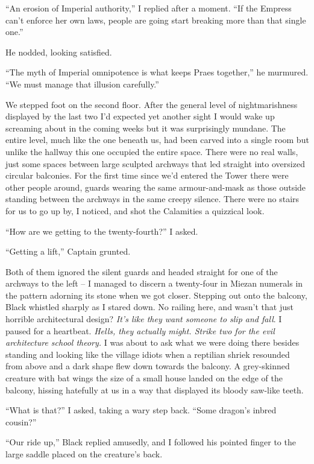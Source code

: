 \documentclass[12pt, openany]{book}
\begin{document}
“An erosion of Imperial authority,” I replied after a moment. “If the Empress can’t enforce her own laws, people are going start breaking more than that single one.”

He nodded, looking satisfied.

“The myth of Imperial omnipotence is what keeps Praes together,” he murmured. “We must manage that illusion carefully.”

We stepped foot on the second floor. After the general level of nightmarishness displayed by the last two I’d expected yet another sight I would wake up screaming about in the coming weeks but it was surprisingly mundane. The entire level, much like the one beneath us, had been carved into a single room but unlike the hallway this one occupied the entire space. There were no real walls, just some spaces between large sculpted archways that led straight into oversized circular balconies. For the first time since we’d entered the Tower there were other people around, guards wearing the same armour-and-mask as those outside standing between the archways in the same creepy silence. There were no stairs for us to go up by, I noticed, and shot the Calamities a quizzical look.

“How are we getting to the twenty-fourth?” I asked.

“Getting a lift,” Captain grunted.

Both of them ignored the silent guards and headed straight for one of the archways to the left – I managed to discern a twenty-four in Miezan numerals in the pattern adorning its stone when we got closer. Stepping out onto the balcony, Black whistled sharply as I stared down. No railing here, and wasn’t that just horrible architectural design? \textit{It’s like they want someone to slip and fall}. I paused for a heartbeat.\textit{ Hells, they actually might. Strike two for the evil architecture school theory.} I was about to ask what we were doing there besides standing and looking like the village idiots when a reptilian shriek resounded from above and a dark shape flew down towards the balcony. A grey-skinned creature with bat wings the size of a small house landed on the edge of the balcony, hissing hatefully at us in a way that displayed its bloody saw-like teeth.

“What is that?” I asked, taking a wary step back. “Some dragon’s inbred cousin?”

“Our ride up,” Black replied amusedly, and I followed his pointed finger to the large saddle placed on the creature’s back.
\end{document}
